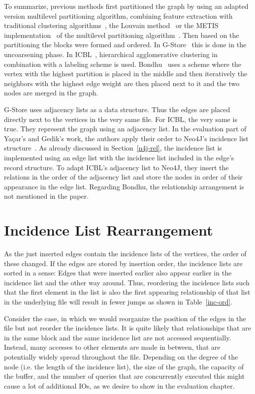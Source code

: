      To summarize, previous methods first partitioned the graph by using an adapted version multilevel partitioning algorithm, combining feature extraction with traditional clustering algorithms~\autocite{overview_clust}, the Louvain method~\autocite{blondel2008fast} or the METIS implementation~\autocite{karypis} of the multilevel partitioning algorithm~\autocite{hendrickson1995multi}.
    Then based on the partitioning the blocks were formed and ordered.
    In G-Store~\autocite{steinhaus2010g} this is done in the uncoarsening phase.
    In ICBL~\autocite{yacsar2017distributed, yacsar2015scalable}, hierarchical agglomerative clustering in combination with a labeling scheme is used.
    Bondhu~\autocite{hoque2012disk} uses a scheme where the vertex with the highest partition is placed in the middle and then iteratively the neighbors with the highest edge weight are then placed next to it and the two nodes are merged in the graph. 
    
    G-Store uses adjacency lists as a data structure.
    Thus the edges are placed directly next to the vertices in the very same file.
    For ICBL, the very same is true.
    They represent the graph using an adjacency list. 
    In the evaluation part of Ya\c{c}ar's and Gedik's work, the authors apply their order to Neo4J's incidence list structure~\autocite{Rodriguez2010ConstructionsFD, robinson2015graph}. 
    As already discussed in Section~\ref{n4j-rel}, the incidence list is implemented using an edge list with the incidence list included in the edge's record structure.
    To adapt ICBL's adjacency list to Neo4J, they insert the relations in the order of the adjacency list and store the nodes in order of their appearance in the edge list.    
    Regarding Bondhu\autocite{hoque2012disk}, the relationship arrangement is not mentioned in the paper.
    
    
\section{Incidence List Rearrangement}\label{\positionnumber}
    As the just inserted edges contain the incidence lists of the vertices, the order of these changed.
    If the edges are stored by insertion order, the incidence lists are sorted in a sense: 
    Edges that were inserted earlier also appear earlier in the incidence list and the other way around.
    Thus, reordering the incidence lists such that the first element in the list is also the first appearing relationship of that list in the underlying file will result in fewer jumps as shown in Table~\ref{inc-ord}.
    
    Consider the case, in which we would reorganize the position of the edges in the file but not reorder the incidence lists. 
    It is quite likely that relationships that are in the same block and the same incidence list are not accessed sequentially.
    Instead, many accesses to other elements are made in between, that are potentially widely spread throughout the file.
    Depending on the degree of the node (i.e. the length of the incidence list), the size of the graph, the capacity of the buffer, and the number of queries that are concurrently executed this might cause a lot of additional IOs, as we desire to show in the evaluation chapter.


